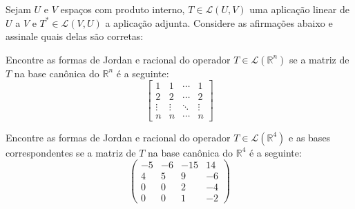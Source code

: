 \documentclass[11pt,a4paper]{article}
\begin{document}
\begin{exercicio}
Sejam $U$ e $V$ espaços com produto interno, $T \in \mathcal{L}(U,V)$ uma aplicação linear de $U$ a $V$ e $T^{*} \in \mathcal{L}(V,U)$ a aplicação adjunta. Considere as afirmações abaixo e assinale quais delas são corretas:
\end{exercicio}
\begin{exercicio}
Encontre as formas de Jordan e racional do operador $T \in \mathcal{L}(\mathbb{R}^n)$ se a matriz de $T$ na base canônica do $\mathbb{R}^n$ é a seguinte:
\[
\begin{bmatrix}
1 & 1 & \cdots & 1 \\
2 & 2 & \cdots & 2 \\
\vdots & \vdots & \ddots & \vdots \\
n & n & \cdots & n
\end{bmatrix}
\]
\end{exercicio}
\solucao{
}
\begin{exercicio}
Encontre as formas de Jordan e racional do operador $T \in \mathcal{L}(\mathbb{R}^4)$ e as bases correspondentes se a matriz de $T$ na base canônica do $\mathbb{R}^4$ é a seguinte:
\[
\begin{pmatrix}
-5 & -6 & -15 & 14 \\
4 & 5 & 9 & -6 \\
0 & 0 & 2 & -4 \\
0 & 0 & 1 & -2
\end{pmatrix}
\]
\end{exercicio}
\end{document}
